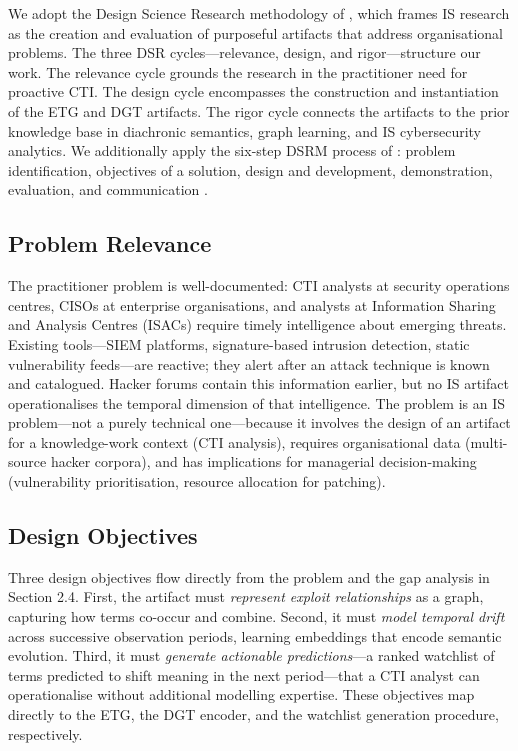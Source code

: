 \documentclass[12pt]{article}
\begin{document}
We adopt the Design Science Research methodology of \textcite{hevner2004}, which frames IS research as the creation and evaluation of purposeful artifacts that address organisational problems. The three DSR cycles---relevance, design, and rigor---structure our work. The relevance cycle grounds the research in the practitioner need for proactive CTI. The design cycle encompasses the construction and instantiation of the ETG and DGT artifacts. The rigor cycle connects the artifacts to the prior knowledge base in diachronic semantics, graph learning, and IS cybersecurity analytics. We additionally apply the six-step DSRM process of \textcite{peffers2007}: problem identification, objectives of a solution, design and development, demonstration, evaluation, and communication \parencite{gregor2013}.

\subsection{Problem Relevance}

The practitioner problem is well-documented: CTI analysts at security operations centres, CISOs at enterprise organisations, and analysts at Information Sharing and Analysis Centres (ISACs) require timely intelligence about emerging threats. Existing tools---SIEM platforms, signature-based intrusion detection, static vulnerability feeds---are reactive; they alert after an attack technique is known and catalogued. Hacker forums contain this information earlier, but no IS artifact operationalises the temporal dimension of that intelligence. The problem is an IS problem---not a purely technical one---because it involves the design of an artifact for a knowledge-work context (CTI analysis), requires organisational data (multi-source hacker corpora), and has implications for managerial decision-making (vulnerability prioritisation, resource allocation for patching).

\subsection{Design Objectives}

Three design objectives flow directly from the problem and the gap analysis in Section 2.4. First, the artifact must \textit{represent exploit relationships} as a graph, capturing how terms co-occur and combine. Second, it must \textit{model temporal drift} across successive observation periods, learning embeddings that encode semantic evolution. Third, it must \textit{generate actionable predictions}---a ranked watchlist of terms predicted to shift meaning in the next period---that a CTI analyst can operationalise without additional modelling expertise. These objectives map directly to the ETG, the DGT encoder, and the watchlist generation procedure, respectively.
\end{document}

